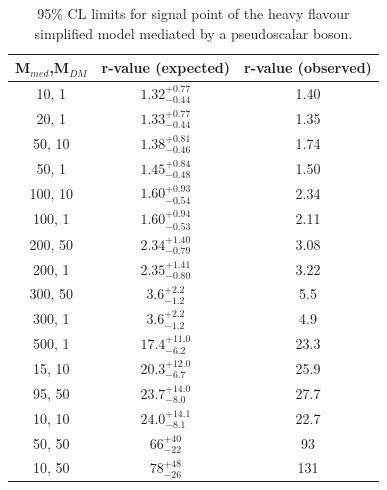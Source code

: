 \begin{table}[h!]
    \caption{%
    95\% CL limits for signal point of the heavy flavour simplified model 
    mediated by a pseudoscalar boson. }
    \label{tab:DMttPS_limits}
    \centering
    \begin{tabular}{ ccc }
        \hline\hline
        M$_{med}$,M$_{DM}$ & r-value (expected) & r-value (observed) \\ 
        \hline
        10, 1   & $1.32_{-0.44}^{+0.77}$ & 1.40 \\
        20, 1   & $1.33_{-0.44}^{+0.77}$ & 1.35 \\
        50, 10  & $1.38_{-0.46}^{+0.81}$ & 1.74 \\
        50, 1   & $1.45_{-0.48}^{+0.84}$ & 1.50 \\
        100, 10 & $1.60_{-0.54}^{+0.93}$ & 2.34 \\
        100, 1  & $1.60_{-0.53}^{+0.94}$ & 2.11 \\
        200, 50 & $2.34_{-0.79}^{+1.40}$ & 3.08 \\
        200, 1  & $2.35_{-0.80}^{+1.41}$ & 3.22 \\
        300, 50 & $3.6_{-1.2}^{+2.2}$    & 5.5  \\
        300, 1  & $3.6_{-1.2}^{+2.2}$    & 4.9  \\
        500, 1  & $17.4_{-6.2}^{+11.0}$  & 23.3 \\
        15, 10  & $20.3_{-6.7}^{+12.0}$  & 25.9 \\
        95, 50  & $23.7_{-8.0}^{+14.0}$  & 27.7 \\
        10, 10  & $24.0_{-8.1}^{+14.1}$  & 22.7 \\
        50, 50  & $66_{-22}^{+40}$       & 93   \\
        10, 50  & $78_{-26}^{+48}$       & 131  \\
        \hline\hline
    \end{tabular}
\end{table}

\clearpage

